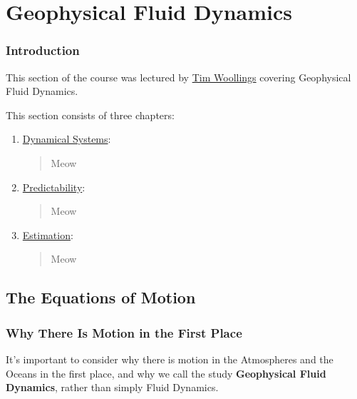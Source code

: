 \part{Geophysical Fluid Dynamics}\label{Geophysical Fluid Dynamics}

\section*{Introduction}

This section of the course was lectured by \href{https://www.physics.ox.ac.uk/our-people/woollings}{Tim Woollings} covering Geophysical Fluid Dynamics.\vspace{5 mm}

\noindent This section consists of three chapters:\vspace{5 mm}

\begin{enumerate}
    \item \hyperref[Dynamical Systems]{Dynamical Systems}: 
        
        \begin{quote}
            Meow
        \end{quote}

    \item \hyperref[Predictability]{Predictability}: 
    
        \begin{quote}
            Meow
        \end{quote}
    
    \item \hyperref[Estimation]{Estimation}:
        
        \begin{quote}
            Meow
        \end{quote}
\end{enumerate}

\chapter{The Equations of Motion}

\section{Why There Is Motion in the First Place}

It's important to consider why there is motion in the Atmospheres and the Oceans in the first place, and why we call the study \textbf{Geophysical Fluid Dynamics}, rather than simply Fluid Dynamics. 

